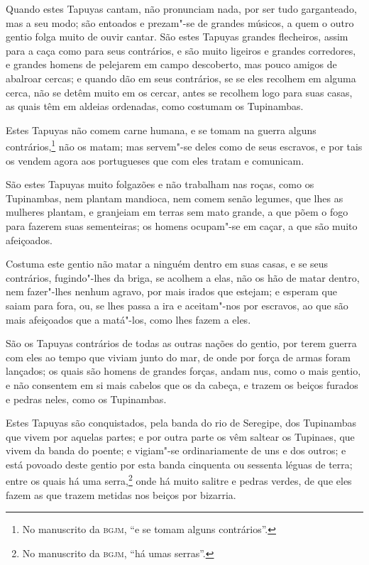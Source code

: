 \begin{linenumbers}
Quando estes Tapuyas cantam, não pronunciam nada, por ser tudo garganteado, mas a seu
modo; são entoados e prezam"-se de grandes músicos, a quem o outro gentio folga muito de
ouvir cantar. São estes Tapuyas grandes flecheiros, assim para a caça como para seus
contrários, e são muito ligeiros e grandes corredores, e grandes homens de pelejarem em
campo descoberto, mas pouco amigos de abalroar cercas; e quando dão em seus contrários, se
se eles recolhem em alguma cerca, não se detêm muito em os cercar, antes se recolhem logo
para suas casas, as quais têm em aldeias ordenadas, como costumam os Tupinambas.

Estes Tapuyas não comem carne humana, e se tomam na guerra alguns contrários,\footnote{ No
manuscrito da \textsc{bgjm}, ``e se tomam alguns contrários''.} não os matam; mas
servem"-se deles como de seus escravos, e por tais os vendem agora aos portugueses que com
eles tratam e comunicam.

São estes Tapuyas muito folgazões e não trabalham nas roças, como os Tupinambas, nem
plantam mandioca, nem comem senão legumes, que lhes as mulheres plantam, e granjeiam em
terras sem mato grande, a que põem o fogo para fazerem suas sementeiras; os homens
ocupam"-se em caçar, a que são muito afeiçoados.

Costuma este gentio não matar a ninguém dentro em suas casas, e se seus contrários,
fugindo"-lhes da briga, se acolhem a elas, não os hão de matar dentro, nem fazer"-lhes
nenhum agravo, por mais irados que estejam; e esperam que saiam para fora, ou, se lhes
passa a ira e aceitam"-nos por escravos, ao que são mais afeiçoados que a matá"-los, como
lhes fazem a eles.

São os Tapuyas contrários de todas as outras nações do gentio, por terem guerra com eles
ao tempo que viviam junto do mar, de onde por força de armas foram lançados; os quais são
homens de grandes forças, andam nus, como o mais gentio, e não consentem em si mais
cabelos que os da cabeça, e trazem os beiços furados e pedras neles, como os Tupinambas.

Estes Tapuyas são conquistados, pela banda do rio de Seregipe, dos Tupinambas que vivem
por aquelas partes; e por outra parte os vêm saltear os Tupinaes, que vivem da banda do
poente; e vigiam"-se ordinariamente de uns e dos outros; e está povoado deste gentio por
esta banda cinquenta ou sessenta léguas de terra; entre os quais há uma serra,\footnote{
No manuscrito da \textsc{bgjm}, ``há umas serras''.} onde há muito salitre e pedras
verdes, de que eles fazem as que trazem metidas nos beiços por bizarria.


\end{linenumbers}
